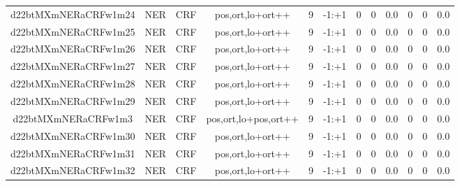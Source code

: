 \documentclass[a4paper]{article}
\begin{document}
\begin{landscape}
\begin{center}
\begin{tabular}{ |c|c|c|c|c|c|c|c|c|c|c|c|}
 
 	
 	\small{ d22btMXmNERaCRFw1m24 } & \small{ NER} & \small{  CRF }  & pos,ort,lo+ort++  &  9 &  \small{  -1:+1 }  &  0 & 0 & 0.0  &  0 & 0 & 0.0 \\
 	

 
 	
 	\small{ d22btMXmNERaCRFw1m25 } & \small{ NER} & \small{  CRF }  & pos,ort,lo+ort++  &  9 &  \small{  -1:+1 }  &  0 & 0 & 0.0  &  0 & 0 & 0.0 \\
 	

 
 	
 	\small{ d22btMXmNERaCRFw1m26 } & \small{ NER} & \small{  CRF }  & pos,ort,lo+ort++  &  9 &  \small{  -1:+1 }  &  0 & 0 & 0.0  &  0 & 0 & 0.0 \\
 	

 
 	
 	\small{ d22btMXmNERaCRFw1m27 } & \small{ NER} & \small{  CRF }  & pos,ort,lo+ort++  &  9 &  \small{  -1:+1 }  &  0 & 0 & 0.0  &  0 & 0 & 0.0 \\
 	

 
 	
 	\small{ d22btMXmNERaCRFw1m28 } & \small{ NER} & \small{  CRF }  & pos,ort,lo+ort++  &  9 &  \small{  -1:+1 }  &  0 & 0 & 0.0  &  0 & 0 & 0.0 \\
 	

 
 	
 	\small{ d22btMXmNERaCRFw1m29 } & \small{ NER} & \small{  CRF }  & pos,ort,lo+ort++  &  9 &  \small{  -1:+1 }  &  0 & 0 & 0.0  &  0 & 0 & 0.0 \\
 	

 
 	
 	\small{ d22btMXmNERaCRFw1m3 } & \small{ NER} & \small{  CRF }  & pos,ort,lo+pos,ort++  &  9 &  \small{  -1:+1 }  &  0 & 0 & 0.0  &  0 & 0 & 0.0 \\
 	

 
 	
 	\small{ d22btMXmNERaCRFw1m30 } & \small{ NER} & \small{  CRF }  & pos,ort,lo+ort++  &  9 &  \small{  -1:+1 }  &  0 & 0 & 0.0  &  0 & 0 & 0.0 \\
 	

 
 	
 	\small{ d22btMXmNERaCRFw1m31 } & \small{ NER} & \small{  CRF }  & pos,ort,lo+ort++  &  9 &  \small{  -1:+1 }  &  0 & 0 & 0.0  &  0 & 0 & 0.0 \\
 	

 
 	
 	\small{ d22btMXmNERaCRFw1m32 } & \small{ NER} & \small{  CRF }  & pos,ort,lo+ort++  &  9 &  \small{  -1:+1 }  &  0 & 0 & 0.0  &  0 & 0 & 0.0 \\
 	


\end{tabular}
\end{center}
\end{landscape}
\end{document}
